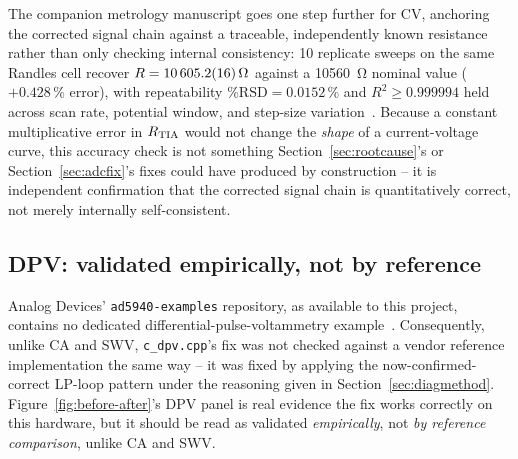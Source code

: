 The companion metrology manuscript goes one step further for CV,
anchoring the corrected signal chain against a traceable, independently
known resistance rather than only checking internal consistency: 10
replicate sweeps on the same Randles cell recover
$R=\SI{10605.2\pm1.6}{\ohm}$ against a \SI{10560}{\ohm} nominal value
($+0.428\,\%$ error), with repeatability $\%\mathrm{RSD}=0.0152\,\%$ and
$R^2\geq0.999994$ held across scan rate, potential window, and step-size
variation~\cite{clement2026linearity}. Because a constant multiplicative
error in $R_{\mathrm{TIA}}$ would not change the \emph{shape} of a current-voltage
curve, this accuracy check is not something Section~\ref{sec:rootcause}'s
or Section~\ref{sec:adcfix}'s fixes could have produced by construction --
it is independent confirmation that the corrected signal chain is
quantitatively correct, not merely internally self-consistent.

\subsection{DPV: validated empirically, not by reference}
\label{sec:dpv-no-ref}
Analog Devices' \texttt{ad5940-examples} repository, as available to this
project, contains no dedicated differential-pulse-voltammetry
example~\cite{ad5940_examples_github}. Consequently, unlike CA and SWV,
\texttt{c\_dpv.cpp}'s fix was not checked against a vendor reference
implementation the same way -- it was fixed by applying the
now-confirmed-correct LP-loop pattern under the reasoning given in
Section~\ref{sec:diagmethod}. Figure~\ref{fig:before-after}'s DPV panel is
real evidence the fix works correctly on this hardware, but it should be
read as validated \emph{empirically}, not \emph{by reference comparison},
unlike CA and SWV.
